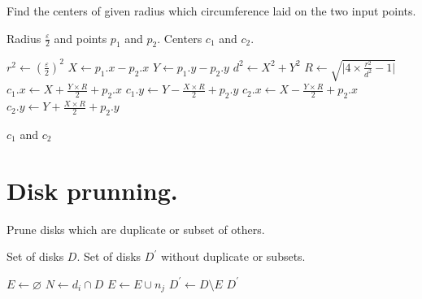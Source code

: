 \documentclass[journal,onecolumn]{IEEEtran}
\begin{document}
\begin{algorithm}
    \caption{Find the centers of given radius which circumference laid on the two input points.}
    \begin{algorithmic}[1]
        \Require Radius $\frac{\varepsilon}{2}$ and points $p_1$ and $p_2$.
        \Ensure Centers $c_1$ and $c_2$.
        
        \State $r^2 \gets (\frac{\varepsilon}{2})^2$
        \State $X \gets p_1.x - p_2.x$
        \State $Y \gets p_1.y - p_2.y$
        \State $d^2 \gets X^2 + Y^2$
        \State $R \gets \sqrt{\lvert 4 \times \frac{r^2}{d^2} - 1 \rvert}$
        \State $c_1.x \gets X + \frac{Y \times R}{2} + p_2.x$
        \State $c_1.y \gets Y - \frac{X \times R}{2} + p_2.y$
        \State $c_2.x \gets X - \frac{Y \times R}{2} + p_2.x$
        \State $c_2.y \gets Y + \frac{X \times R}{2} + p_2.y$
        
        \State \Return $c_1$ and $c_2$
        \EndFunction
    \end{algorithmic}
\end{algorithm}

\section{Disk prunning.}\label{app:disks}

\begin{algorithm}
    \caption{Prune disks which are duplicate or subset of others.}
    \begin{algorithmic}[1]
        \Require Set of disks $D$.
        \Ensure Set of disks $D^{\prime}$ without duplicate or subsets.
        
        \State $E \gets \varnothing$
            \State $N \gets d_i \cap D$
                        \State $E \gets E \cup {n_j}$
                \EndIf
            \EndFor
        \EndFor        
        \State $D^{\prime} \gets D \setminus E$
        \State \Return $D^{\prime}$
        \EndFunction
    \end{algorithmic}
\end{algorithm}



\end{document}
